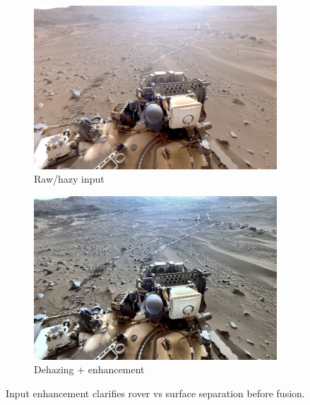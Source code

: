 \documentclass[12pt]{article}
\begin{document}
\begin{figure}[H]
  \centering
  \begin{subfigure}[t]{0.49\textwidth}
    \centering
    \includegraphics[width=\linewidth]{non_enhanced.jpg}
    \caption{Raw/hazy input}
  \end{subfigure}\hfill
  \begin{subfigure}[t]{0.49\textwidth}
    \centering
    \includegraphics[width=\linewidth]{enhanced.jpg}
    \caption{Dehazing + enhancement}
  \end{subfigure}
  \caption{Input enhancement clarifies rover vs surface separation before fusion.}
  \label{fig:dehaze-enhancement}
\end{figure}
\FloatBarrier
\end{document}
